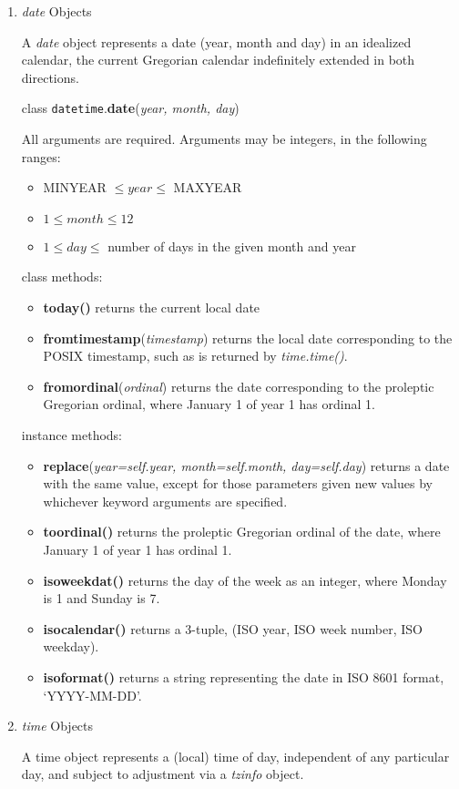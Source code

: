 \begin{enumerate}
\item \textit{date} Objects

A \textit{date} object represents a date (year, month and day) in an idealized calendar, the current Gregorian calendar indefinitely extended in both directions.

class \texttt{datetime}.\textbf{date}(\textit{year, month, day})

All arguments are required. Arguments may be integers, in the following ranges:
\begin{itemize}
\item MINYEAR $\le year \le$ MAXYEAR
\item $1 \le month \le 12$
\item $1 \le day \le$ number of days in the given month and year
\end{itemize}
class methods:
\begin{itemize}
\item \textbf{today()} returns the current local date
\item \textbf{fromtimestamp}(\textit{timestamp}) returns the local date corresponding to the POSIX timestamp, such as is returned by \textit{time.time()}.
\item \textbf{fromordinal}(\textit{ordinal}) returns the date corresponding to the proleptic Gregorian ordinal, where January 1 of year 1 has ordinal 1.
\end{itemize}
instance methods:
\begin{itemize}
\item \textbf{replace}(\textit{year=self.year, month=self.month, day=self.day}) returns a date with the same value, except for those parameters given new values by whichever keyword arguments are specified.
\item \textbf{toordinal()} returns the proleptic Gregorian ordinal of the date, where January 1 of year 1 has ordinal 1.
\item \textbf{isoweekdat()} returns the day of the week as an integer, where Monday is 1 and Sunday is 7.
\item \textbf{isocalendar()} returns a 3-tuple, (ISO year, ISO week number, ISO weekday).
\item \textbf{isoformat()} returns a string representing the date in ISO 8601 format, ‘YYYY-MM-DD’.
\end{itemize}

\item \textit{time} Objects

A time object represents a (local) time of day, independent of any particular day, and subject to adjustment via a \textit{tzinfo} object.


\end{enumerate}
